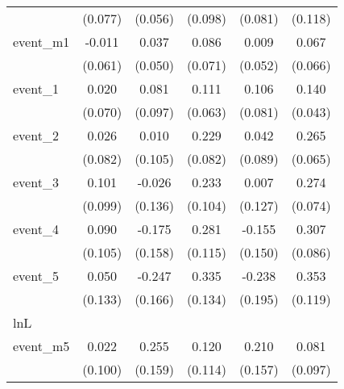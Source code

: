 {\begin{tabular}{l*{5}{c}}
            &     (0.077)         &     (0.056)         &     (0.098)         &     (0.081)         &     (0.118)         \\
[1em]
event\_m1    &      -0.011         &       0.037         &       0.086         &       0.009         &       0.067         \\
            &     (0.061)         &     (0.050)         &     (0.071)         &     (0.052)         &     (0.066)         \\
[1em]
event\_1     &       0.020         &       0.081         &       0.111         &       0.106         &       0.140\sym{**} \\
            &     (0.070)         &     (0.097)         &     (0.063)         &     (0.081)         &     (0.043)         \\
[1em]
event\_2     &       0.026         &       0.010         &       0.229\sym{**} &       0.042         &       0.265\sym{***}\\
            &     (0.082)         &     (0.105)         &     (0.082)         &     (0.089)         &     (0.065)         \\
[1em]
event\_3     &       0.101         &      -0.026         &       0.233\sym{*}  &       0.007         &       0.274\sym{***}\\
            &     (0.099)         &     (0.136)         &     (0.104)         &     (0.127)         &     (0.074)         \\
[1em]
event\_4     &       0.090         &      -0.175         &       0.281\sym{*}  &      -0.155         &       0.307\sym{***}\\
            &     (0.105)         &     (0.158)         &     (0.115)         &     (0.150)         &     (0.086)         \\
[1em]
event\_5     &       0.050         &      -0.247         &       0.335\sym{*}  &      -0.238         &       0.353\sym{**} \\
            &     (0.133)         &     (0.166)         &     (0.134)         &     (0.195)         &     (0.119)         \\
\hline
lnL         &                     &                     &                     &                     &                     \\
event\_m5    &       0.022         &       0.255         &       0.120         &       0.210         &       0.081         \\
            &     (0.100)         &     (0.159)         &     (0.114)         &     (0.157)         &     (0.097)         \\

\end{tabular}}
